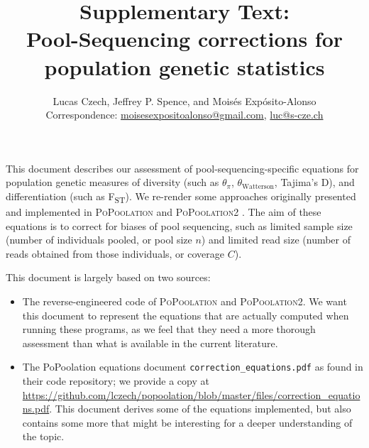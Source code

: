 \documentclass[a4paper,9pt,DIV=14]{scrartcl}
\title{Supplementary Text: \\ Pool-Sequencing corrections for population genetic statistics}
\author{Lucas Czech, Jeffrey P. Spence, and Moisés Expósito-Alonso \\ Correspondence: \href{mailto:moisesexpositoalonso@gmail.com}{moisesexpositoalonso@gmail.com}, \href{mailto:luc@s-cze.ch}{luc@s-cze.ch}}
\date{}
\newcommand{\beginsupplement}{%
    \setcounter{table}{0}
    \renewcommand{\thetable}{S\arabic{table}}%
    \setcounter{figure}{0}
    \renewcommand{\thefigure}{S\arabic{figure}}%
}
\newcommand\toolname{\textsc}
\newcommand{\fst}{F\textsubscript{ST}}
\begin{document}

\beginsupplement


\begingroup
\let\center\flushleft
\let\endcenter\endflushleft
\maketitle
\endgroup



\vspace*{-2.5em}

This document describes our assessment of pool-sequencing-specific equations for population genetic measures of diversity (such as $\theta_\pi$, $\theta_\text{Watterson}$, Tajima's D), and differentiation (such as \fst{}). 
We re-render some approaches originally presented and implemented in \toolname{PoPoolation} \cite{Kofler2011a} and \toolname{PoPoolation2} \cite{Kofler2011b}.
The aim of these equations is to correct for biases of pool sequencing, such as limited sample size (number of individuals pooled, or pool size $n$) and limited read size (number of reads obtained from those individuals, or coverage $C$).

This document is largely based on two sources:
\begin{itemize}
  \item The reverse-engineered code of \toolname{PoPoolation} and \toolname{PoPoolation2}. We want this document to represent the equations that are actually computed when running these programs, as we feel that they need a more thorough assessment than what is available in the current literature.
  \item The PoPoolation equations document \texttt{correction\_equations.pdf} as found in their code repository; we provide a copy at \url{https://github.com/lczech/popoolation/blob/master/files/correction_equations.pdf}. This document derives some of the equations implemented, but also contains some more that might be interesting for a deeper understanding of the topic.
\end{itemize}
\end{document}

